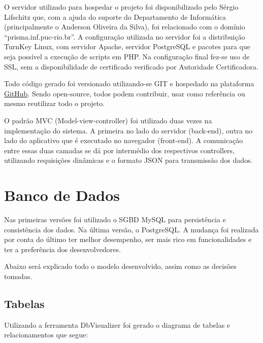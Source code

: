 \documentclass[graduacao,brazil]{ThesisPUC}
\begin{document}
O servidor utilizado para hospedar o projeto foi disponibilizado pelo Sérgio Lifschitz que, com a ajuda do suporte do Departamento de Informática (principalmente o Anderson Oliveira da Silva), foi relacionado com o domínio “prisma.inf.puc-rio.br”. A configuração utilizada no servidor foi a distribuição TurnKey Linux, com servidor Apache\cite{Apache}, servidor PostgreSQL\cite{PostgreSQL} e pacotes para que seja possível a execução de scripts em PHP\cite{PHP}. Na configuração final fez-se uso de SSL, sem a disponibilidade de certificado verificado por Autoridade Certificadora.

Todo código gerado foi versionado utilizando-se GIT e hospedado na plataforma \href{https://github.com/PrismaDev/prisma}{GitHub}. Sendo open-source, todos podem contribuir, usar como referência ou mesmo reutilizar todo o projeto.

O padrão MVC (Model-view-controller) foi utilizado duas vezes na implementação do sistema. A primeira no lado do servidor (back-end), outra no lado do aplicativo que é executado no navegador (front-end). A comunicação entre essas duas camadas se dá por intermédio dos respectivos controllers, utilizando requisições dinâmicas e o formato JSON para transmissão dos dados.

\section{Banco de Dados}

Nas primeiras versões foi utilizado o SGBD MySQL para persistência e consistência dos dados. Na última versão, o PostgreSQL. A mudança foi realizada por conta do último ter melhor desempenho, ser mais rico em funcionalidades e ter a preferência dos desenvolvedores.

Abaixo será explicado todo o modelo desenvolvido, assim como as decisões tomadas.

\subsection{Tabelas}

Utilizando a ferramenta DbVisualizer\cite{DbVisualizer} foi gerado o diagrama de tabelas e relacionamentos que segue:
\end{document}
